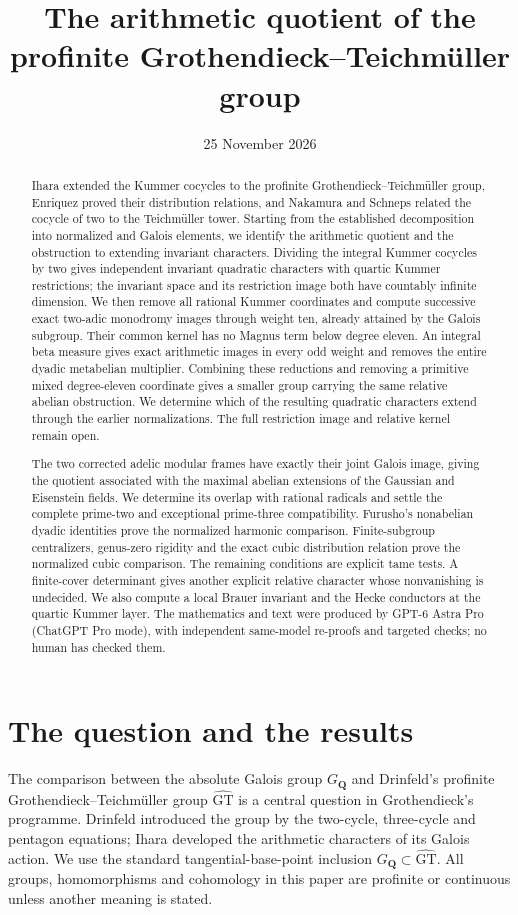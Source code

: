 \documentclass[11pt,a4paper]{article}
\title{The arithmetic quotient of the profinite Grothendieck--Teichm\"uller group}
\author{}
\date{25 November 2026}
\theoremstyle{definition}
\theoremstyle{remark}
\newcommand{\GT}{\widehat{\mathrm{GT}}}
\newcommand{\Q}{\mathbf Q}
\newcommand{\GQ}{G_{\Q}}
\begin{document}
\maketitle
\begin{abstract}
Ihara extended the Kummer cocycles to the profinite Grothendieck--Teichm\"uller group, Enriquez proved their distribution relations, and Nakamura and Schneps related the cocycle of two to the Teichm\"uller tower. Starting from the established decomposition into normalized and Galois elements, we identify the arithmetic quotient and the obstruction to extending invariant characters. Dividing the integral Kummer cocycles by two gives independent invariant quadratic characters with quartic Kummer restrictions; the invariant space and its restriction image both have countably infinite dimension. We then remove all rational Kummer coordinates and compute successive exact two-adic monodromy images through weight ten, already attained by the Galois subgroup. Their common kernel has no Magnus term below degree eleven. An integral beta measure gives exact arithmetic images in every odd weight and removes the entire dyadic metabelian multiplier. Combining these reductions and removing a primitive mixed degree-eleven coordinate gives a smaller group carrying the same relative abelian obstruction. We determine which of the resulting quadratic characters extend through the earlier normalizations. The full restriction image and relative kernel remain open.

The two corrected adelic modular frames have exactly their joint Galois image, giving the quotient associated with the maximal abelian extensions of the Gaussian and Eisenstein fields. We determine its overlap with rational radicals and settle the complete prime-two and exceptional prime-three compatibility. Furusho's nonabelian dyadic identities prove the normalized harmonic comparison. Finite-subgroup centralizers, genus-zero rigidity and the exact cubic distribution relation prove the normalized cubic comparison. The remaining conditions are explicit tame tests. A finite-cover determinant gives another explicit relative character whose nonvanishing is undecided. We also compute a local Brauer invariant and the Hecke conductors at the quartic Kummer layer. The mathematics and text were produced by GPT-6 Astra Pro (ChatGPT Pro mode), with independent same-model re-proofs and targeted checks; no human has checked them.
\end{abstract}

\section{The question and the results}
The comparison between the absolute Galois group $\GQ$ and Drinfeld's profinite Grothendieck--Teichm\"uller group $\GT$ is a central question in Grothendieck's programme. Drinfeld introduced the group by the two-cycle, three-cycle and pentagon equations; Ihara developed the arithmetic characters of its Galois action. We use the standard tangential-base-point inclusion $\GQ\subset\GT$. All groups, homomorphisms and cohomology in this paper are profinite or continuous unless another meaning is stated.
\end{document}
